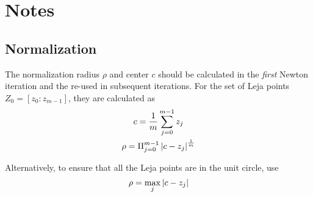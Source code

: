 \clearpage
\section{Notes}

\subsection{Normalization}

The normalization radius $\rho$ and center $c$  should be calculated in the
\emph{first} Newton iteration and the re-used in subsequent iterations. For the
set of Leja points $Z_0 = [z_{0}:z_{m-1}]$, they are calculated as
%
\begin{gather}
  c = \frac{1}{m} \sum_{j=0}^{m-1} z_j \\
  \rho = \Pi_{j=0}^{m-1} \left|c - z_j\right|^{\frac{1}{m}}
\end{gather}

Alternatively, to ensure that all the Leja points are in the unit circle, use
\begin{equation}
  \rho = \max_j \left|c - z_j\right|
\end{equation}
